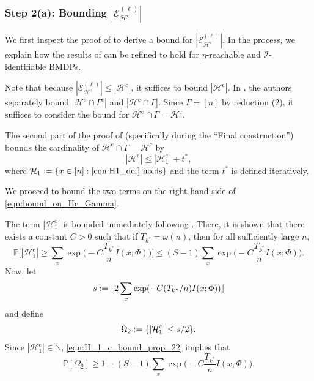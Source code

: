 \documentclass[11pt]{article}
\newcommand{\eqdef}{\vcentcolon=}
\newcommand{\mcE}{\mathcal{E}}
\newcommand{\mcH}{\mathcal{H}}
\newcommand{\mcI}{\mathcal{I}}
\newcommand{\mbbP}{\mathbb{P}}
\newcommand{\mbbN}{\mathbb{N}}
\theoremstyle{definition}
\theoremstyle{definition}
\begin{document}
\subsubsection*{Step 2(a): Bounding $|\mcE^{(\ell)}_{\mcH^{\mathrm{c}}}|$}

We first inspect the proof of \cite[Proposition 20]{Jedra:2022} to derive a bound for $|\mcE^{(\ell)}_{\mcH^{\mathrm{c}}}|$.
In the process, we explain how the results of \cite{Jedra:2022} can be refined to hold for $\eta$-reachable and $\mcI$-identifiable \glspl{BMDP}.

Note that because $|\mcE^{(\ell)}_{\mcH^{\mathrm{c}}}|\leq |\mcH^{\mathrm{c}}|$, it suffices to bound $|\mcH^{\mathrm{c}}|$.
In \cite{Jedra:2022}, the authors separately bound $|\mcH^{\mathrm{c}}\cap\Gamma^{\mathrm{c}}|$ and $|\mcH^{\mathrm{c}}\cap\Gamma|$.
Since $\Gamma=[n]$ by reduction (2), it suffices to consider the bound for $\mcH^{\mathrm{c}}\cap\Gamma=\mcH^{\mathrm{c}}$.

The second part of the proof of \cite[Proposition 20]{Jedra:2022} (specifically during the ``Final construction'') bounds the cardinality of $\mcH^{\mathrm{c}}\cap\Gamma=\mcH^{\mathrm{c}}$ by
\begin{equation}
	\label{eqn:bound_on_Hc_Gamma}
	|\mcH^{\mathrm{c}}|
	\leq
	|\mcH_1^{\mathrm{c}}|+t^*
	,
\end{equation}
where $\mcH_1 \eqdef \{x\in[n]:\textnormal{\eqref{eqn:H1_def} holds}\}$ and the term $t^*$ is defined iteratively.

We proceed to bound the two terms on the right-hand side of \eqref{eqn:bound_on_Hc_Gamma}.

The term $|\mcH_1^{\mathrm{c}}|$ is bounded immediately following \cite[Proposition 22]{Jedra:2022}.
There, it is shown that there exists a constant $C>0$ such that if $T_{k^*}=\omega(n)$, then for all sufficiently large $n$,
\begin{equation}
	\label{eqn:H_1_c_bound_prop_22}
	\mbbP\biggl[|\mcH_1^{\mathrm{c}}|\geq \sum_x\exp\biggl(-C\frac{T_{k^*}}{n}I(x;\Phi)\biggr)\biggr]
	\leq
	(S-1)\sum_x\exp\biggl(-C\frac{T_{k^*}}{n}I(x;\Phi)\biggr).
\end{equation}
Now, let
\begin{equation}
	\label{eqn:constant_s_def}
	s\eqdef \lfloor 2\sum_x\exp(-C(T_{k^*}/n) I(x;\Phi))\rfloor
\end{equation}
and define
\begin{equation}
	\label{eqn:bound_on_mcH1_event}
	\Omega_2\eqdef \{|\mcH_1^{\mathrm{c}}|\leq s/2\}.
\end{equation}
Since $|\mcH_1^{\mathrm{c}}|\in\mbbN$, \eqref{eqn:H_1_c_bound_prop_22} implies that
\begin{equation}
	\label{eqn:bound_on_H1_c}
	\mbbP[\Omega_2]\geq 1-(S-1)\sum_x\exp\biggl(-C\frac{T_{k^*}}{n}I(x;\Phi)\biggr).
\end{equation}
\end{document}
